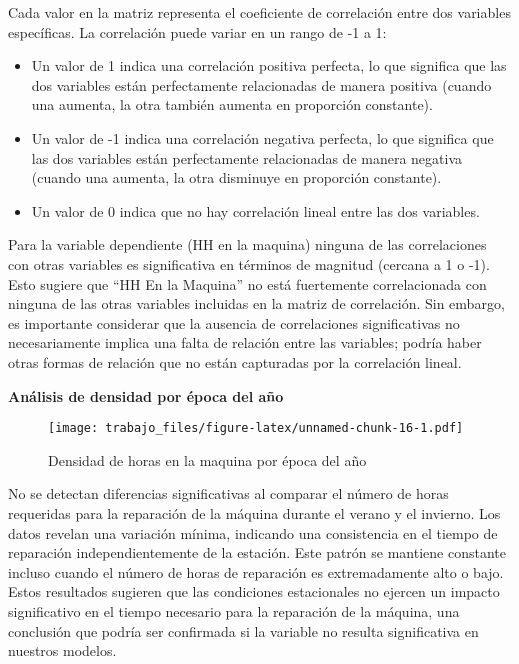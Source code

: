 \documentclass[
  11pt,
  bookmarksnumbered]{article}
\begin{document}
Cada valor en la matriz representa el coeficiente de correlación entre dos variables específicas.
La correlación puede variar en un rango de -1 a 1:

\begin{itemize}
\item
  Un valor de 1 indica una correlación positiva perfecta, lo que significa que las dos variables están perfectamente relacionadas de manera positiva (cuando una aumenta, la otra también aumenta en proporción constante).
\item
  Un valor de -1 indica una correlación negativa perfecta, lo que significa que las dos variables están perfectamente relacionadas de manera negativa (cuando una aumenta, la otra disminuye en proporción constante).
\item
  Un valor de 0 indica que no hay correlación lineal entre las dos variables.
\end{itemize}

Para la variable dependiente (HH en la maquina) ninguna de las correlaciones con otras variables es significativa en términos de magnitud (cercana a 1 o -1).
Esto sugiere que ``HH En la Maquina'' no está fuertemente correlacionada con ninguna de las otras variables incluidas en la matriz de correlación.
Sin embargo, es importante considerar que la ausencia de correlaciones significativas no necesariamente implica una falta de relación entre las variables; podría haber otras formas de relación que no están capturadas por la correlación lineal.

\newpage

\textbf{Análisis de densidad por época del año}

\begin{figure}
\centering
\texttt{[image: trabajo\_files/figure-latex/unnamed-chunk-16-1.pdf]}
\caption{\label{fig:unnamed-chunk-16}Densidad de horas en la maquina por época del año}
\end{figure}

No se detectan diferencias significativas al comparar el número de horas requeridas para la reparación de la máquina durante el verano y el invierno.
Los datos revelan una variación mínima, indicando una consistencia en el tiempo de reparación independientemente de la estación.
Este patrón se mantiene constante incluso cuando el número de horas de reparación es extremadamente alto o bajo.
Estos resultados sugieren que las condiciones estacionales no ejercen un impacto significativo en el tiempo necesario para la reparación de la máquina, una conclusión que podría ser confirmada si la variable no resulta significativa en nuestros modelos.
\end{document}
